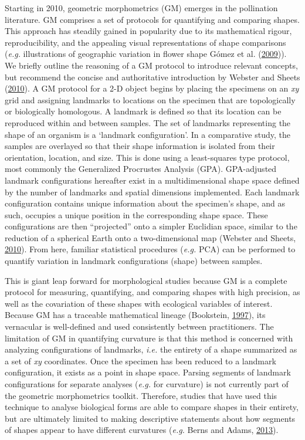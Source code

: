 \documentclass[]{article}
\begin{document}
Starting in 2010, geometric morphometrics (GM) emerges in the
pollination literature. GM comprises a set of protocols for quantifying
and comparing shapes. This approach has steadily gained in popularity
due to its mathematical rigour, reproducibility, and the appealing
visual representations of shape comparisons (\emph{e.g.} illustrations
of geographic variation in flower shape Gómez et al.
(\protect\hyperlink{ref-gomez_2009}{2009})). We briefly outline the
reasoning of a GM protocol to introduce relevant concepts, but recommend
the concise and authoritative introduction by Webster and Sheets
(\protect\hyperlink{ref-webster_2010}{2010}). A GM protocol for a 2-D
object begins by placing the specimens on an \emph{xy} grid and
assigning landmarks to locations on the specimen that are topologically
or biologically homologous. A landmark is defined so that its location
can be reproduced within and between samples. The set of landmarks
representing the shape of an organism is a `landmark configuration'. In
a comparative study, the samples are overlayed so that their shape
information is isolated from their orientation, location, and size. This
is done using a least-squares type protocol, most commonly the
Generalized Procrustes Analysis (GPA). GPA-adjusted landmark
configurations hereafter exist in a multidimensional shape space defined
by the number of landmarks and spatial dimensions implemented. Each
landmark configuration contains unique information about the specimen's
shape, and as such, occupies a unique position in the corresponding
shape space. These configurations are then ``projected'' onto a simpler
Euclidian space, similar to the reduction of a spherical Earth onto a
two-dimensional map (Webster and Sheets,
\protect\hyperlink{ref-webster_2010}{2010}). From here, familiar
statistical procedures (\emph{e.g.} PCA) can be performed to quantify
variation in landmark configurations (shape) between samples.

This is giant leap forward for morphological studies because GM is a
complete protocol for measuring, quantifying, and comparing shapes with
high precision, as well as the covariation of these shapes with
ecological variables of interest. Because GM has a traceable
mathematical lineage (Bookstein,
\protect\hyperlink{ref-bookstein_1997}{1997}), its vernacular is
well-defined and used consistently between practitioners. The limitation
of GM in quantifying curvature is that this method is concerned with
analyzing configurations of landmarks, \emph{i.e.} the entirety of a
shape summarized as a set of \emph{xy} coordinates. Once the specimen
has been reduced to a landmark configuration, it exists as a point in
shape space. Parsing segments of landmark configurations for separate
analyses (\emph{e.g.} for curvature) is not currently part of the
geometric morphometrics toolkit. Therefore, studies that have used this
technique to analyse biological forms are able to compare shapes in
their entirety, but are ultimately limited to making descriptive
statements about how segments of shapes appear to have different
curvatures (\emph{e.g.} Berns and Adams,
\protect\hyperlink{ref-berns_2013}{2013}).
\end{document}

